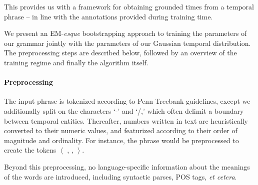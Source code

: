 This provides us with a framework for obtaining grounded times from a
	temporal phrase -- in line with the annotations provided during training
	time.


We present an EM-\textit{esque} bootstrapping approach to training the 
	parameters of our grammar jointly with the parameters of our 
	Gaussian temporal distribution.
The preprocessing steps are described below, followed by an overview
	of the training regime and finally the algorithm itself.

\paragraph{Preprocessing}
The input phrase is tokenized according to Penn Treebank guidelines,
	except we additionally split on the characters `-' and `/,' which
	often delimit a boundary between temporal entities.
Thereafter, numbers written in text are heuristically converted to their
	numeric values, and featurized according to their order of magnitude
	and ordinality.
For instance, the phrase  would be preprocessed to create the
	tokens $\left<\right.$  , \tp{-} ,  
		$\left.\right>$.

Beyond this preprocessing, no language-specific information about the meanings
	of the words are introduced, including syntactic parses, POS tags,
	\textit{et cetera}.


